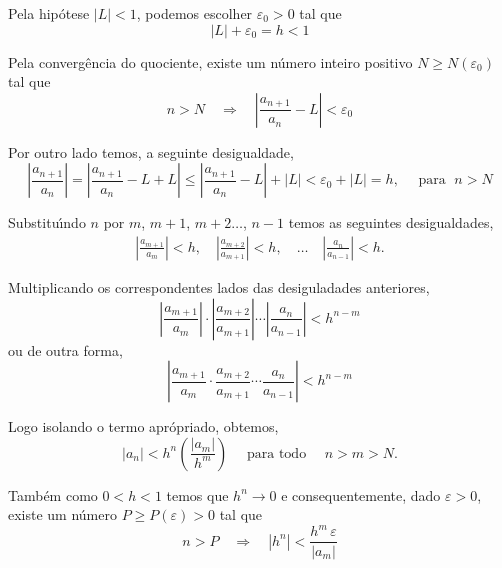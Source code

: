 \prova Pela hip\'{o}tese $|L|<1$, podemos escolher $\varepsilon_{0}>0$ tal que
\begin{equation*}
    |L|+\varepsilon_{0}=h<1
\end{equation*}

Pela converg\^{e}ncia do quociente, existe um n\'{u}mero inteiro positivo $N \geq N(\varepsilon_0)$ tal que
\begin{equation*}
    n>N\quad \Rightarrow\quad \left| \frac{a_{n+1}}{a_{n}}-L\right| <\varepsilon_{0}
\end{equation*}

Por outro lado temos, a seguinte desigualdade,
\begin{equation*}
 \left| \frac{a_{n+1}}{a_{n}}\right|=\left| \frac{a_{n+1}}{a_{n}}-L+L\right|\leq \left| \frac{a_{n+1}}{a_{n}}-L\right|+|L|<\varepsilon_{0}+|L|=h, \quad \text{ para } \;  n>N
\end{equation*}

Substitu\'{\i}ndo $n$ por $m$, $m+1$, $m+2\ldots$, $n-1$ temos as seguintes desigualdades,
\begin{align*}
 \left|\frac{a_{m+1}}{a_{m}}\right|<h,\quad \left|\frac{a_{m+2}}{a_{m+1}}\right|<h,\quad \ldots\quad \left|\frac{a_{n}}{a_{n-1}}\right|<h.
\end{align*}

Multiplicando os correspondentes lados das desiguladades anteriores,
\begin{equation*}
 \left|\frac{a_{m+1}}{a_{m}}\right|\cdot \left|\frac{a_{m+2}}{a_{m+1}}\right|\cdots \left|\frac{a_{n}}{a_{n-1}}\right|< h^{n-m}
\end{equation*}
ou de outra forma,
\begin{equation*}
 \left|\frac{a_{m+1}}{a_{m}}\cdot \frac{a_{m+2}}{a_{m+1}}\cdots \frac{a_{n}}{a_{n-1}}\right|< h^{n-m}
\end{equation*}

Logo isolando o termo apr\'{o}priado, obtemos,
\begin{equation}\label{criter002}
    |a_n|<h^n\left(\frac{|a_m|}{h^m} \right)\quad \text{ para todo }\quad n>m>N.
\end{equation}

Tamb\'{e}m como $0<h<1$ temos que $h^n\to 0$ e consequentemente, dado $\varepsilon>0$, existe um n\'{u}mero $P\geq P(\varepsilon)>0$ tal que
\begin{equation}\label{criter003}
    n>P \quad \Rightarrow\quad |h^n|<\frac{h^m\,\varepsilon}{|a_m|}
\end{equation}

